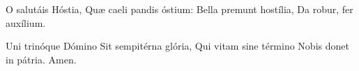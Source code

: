 O salutáis Hóstia,
Quæ caeli pandis óstium:
Bella premunt hostília,
Da robur, fer auxílium.

Uni trinóque Dómino
Sit sempitérna glória,
Qui vitam sine término
Nobis donet in pátria. Amen.